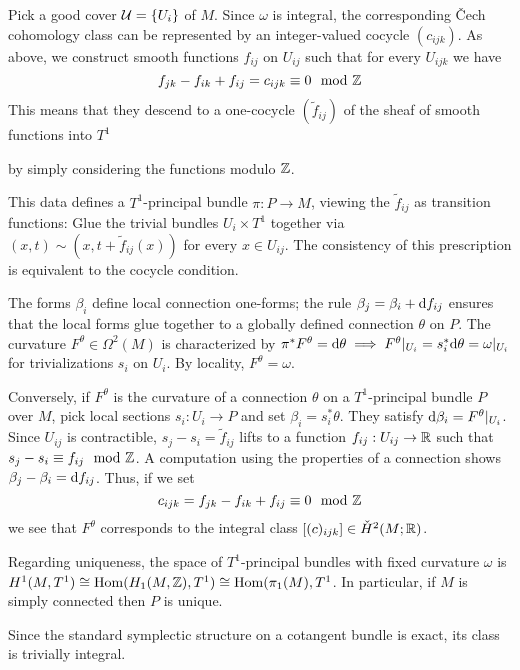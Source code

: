 \documentclass[parskip=half]{scrartcl}
\begin{document}
\begin{myproof}
	\begin{onboard}
	Pick a good cover $\mathcal{U}=\{U_i\}$ of $M$. Since $\omega$ is integral, the corresponding \v{C}ech cohomology class can be represented by an integer-valued cocycle $(c_{ijk})$. As above, we construct smooth functions $f_{ij}$ on $U_{ij}$ such that for every $U_{ijk}$ we have
	\begin{equation*}
		f_{jk}-f_{ik}+f_{ij}=c_{ijk}\equiv 0 \mod {\mathbb{Z}}
	\end{equation*}
	This means that they descend to a one-cocycle $(\tilde f_{ij})$ of the sheaf of smooth functions into $T^1$
	\end{onboard} 
	by simply considering the functions modulo $\mathbb{Z}$.
	\begin{onboard}
	This data defines a $T^1$-principal bundle $\pi:P\to M$, viewing the $\tilde f_{ij}$ as transition functions: Glue the trivial bundles $U_i\times T^1$ together via $(x,t)\sim(x,t+\tilde f_{ij}(x))$ for every $x\in U_{ij}$. The consistency of this prescription is equivalent to the cocycle condition.
	
	The forms $\beta_i$ define local connection one-forms; the rule $\beta_j=\beta_i+\mathrm{d} f_{ij}$ ensures that the local forms glue together to a globally defined connection $\theta$ on $P$. The curvature $F^\theta\in \Omega^2(M)$ is characterized by $\pi^*F^\theta=\mathrm{d}\theta\implies F^\theta|_{U_i}=s_i^*\mathrm{d}\theta=\omega|_{U_i}$ for trivializations $s_i$ on $U_i$. By locality, $F^\theta=\omega$.
	
	Conversely, if $F^\theta$ is the curvature of a connection $\theta$ on a $T^1$-principal bundle $P$ over $M$, pick local sections $s_i:U_i\to P$ and set $\beta_i=s_i^*\theta$. They satisfy $\mathrm{d} \beta_i = F^\theta|_{U_i}$. Since $U_{ij}$ is contractible, $s_j-s_i=\tilde f_{ij}$ lifts to a function $f_{ij}:U_{ij}\to \mathbb{R}$ such that $s_j-s_i\equiv f_{ij}\mod {\mathbb{Z}}$. A computation using the properties of a connection shows $\beta_j-\beta_i=\mathrm{d} f_{ij}$. Thus, if we set 
	\begin{equation*}
		c_{ijk}=f_{jk}-f_{ik}+f_{ij}\equiv 0 \mod {\mathbb{Z}}
	\end{equation*}
	we see that $F^\theta$ corresponds to the integral class $[(c)_{ijk}]\in \check H^2(M;\mathbb{R})$. 
	\end{onboard}
\end{myproof}

\begin{onboard}
\begin{rem}\leavevmode
	\begin{numberedlist}
		\item Regarding uniqueness, the space of $T^1$-principal bundles with fixed curvature $\omega$ is $H^1(M,T^1)\cong \operatorname{Hom}(H_1(M,\mathbb{Z}),T^1)\cong \operatorname{Hom}(\pi_1(M),T^1$. In particular, if $M$ is simply connected then $P$ is unique.
		\item Since the standard symplectic structure on a cotangent bundle is exact, its class is trivially integral.
	\end{numberedlist}
\end{rem}
\end{onboard}
\end{document}
